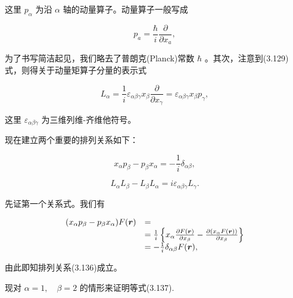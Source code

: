 这里 $p_{\alpha}$ 为沿 $\alpha$ 轴的动量算子。动量算子一般写成

\begin{equation*}
p _ {a} = \frac {\hbar}{i} \frac {\partial}{\partial x _ {a}},
\end{equation*}

为了书写简洁起见，我们略去了普朗克(Planck)常数 $\hbar$ 。其次，注意到(3.129)式，则得关于动量矩算子分量的表示式

\begin{equation*}
L _ {\alpha} = \frac {1}{i} \varepsilon_ {\alpha \beta \gamma} x _ {\beta} \frac {\partial}{\partial x _ {\gamma}} = \varepsilon_ {\alpha \beta \gamma} x _ {\beta} p _ {\gamma},\tag{3.135}
\end{equation*}

这里 $\varepsilon_{\alpha\beta\gamma}$ 为三维列维-齐维他符号。

现在建立两个重要的排列关系如下：

\begin{equation*}
x _ {\alpha} p _ {\beta} - p _ {\beta} x _ {\alpha} = - \frac {1}{i} \delta_ {\alpha \beta},\tag{3.136}
\end{equation*}

\begin{equation*}
L _ {\alpha} L _ {\beta} - L _ {\beta} L _ {\alpha} = i \varepsilon_ {\alpha \beta \gamma} L _ {\gamma}.\tag{3.137}
\end{equation*}

先证第一个关系式。我们有

\begin{equation*}
\begin{array}{r l} (x _ {\alpha} p _ {\beta} - p _ {\beta} x _ {\alpha}) F (\boldsymbol {r}) & = \\ & = \frac {1}{i} \left\{x _ {\alpha} \frac {\partial F (\boldsymbol {r})}{\partial x _ {\beta}} - \frac {\partial (x _ {\alpha} F (\boldsymbol {r}))}{\partial x _ {\beta}} \right\} \\ & = - \frac {1}{i} \delta_ {\alpha \beta} F (\boldsymbol {r}), \end{array}
\end{equation*}

由此即知排列关系(3.136)成立。

现对 $\alpha=1,\quad\beta=2$ 的情形来证明等式(3.137).

